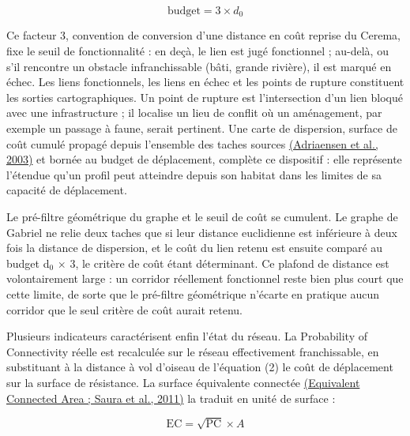 \documentclass[a4paper,11pt]{report}
\begin{document}
\begin{equation*}
\mathrm{budget} = 3 \times d_0
\tag{3}
\end{equation*}

Ce facteur 3, convention de conversion d'une distance en coût reprise du Cerema, fixe le seuil de fonctionnalité : en deçà, le lien est jugé fonctionnel ; au-delà, ou s'il rencontre un obstacle infranchissable (bâti, grande rivière), il est marqué en échec. Les liens fonctionnels, les liens en échec et les points de rupture constituent les sorties cartographiques. Un point de rupture est l'intersection d'un lien bloqué avec une infrastructure ; il localise un lieu de conflit où un aménagement, par exemple un passage à faune, serait pertinent. Une carte de dispersion, surface de coût cumulé propagé depuis l'ensemble des taches sources \hyperref[sec:bibliographie]{(Adriaensen et al., 2003)} et bornée au budget de déplacement, complète ce dispositif : elle représente l'étendue qu'un profil peut atteindre depuis son habitat dans les limites de sa capacité de déplacement.

Le pré-filtre géométrique du graphe et le seuil de coût se cumulent. Le graphe de Gabriel ne relie deux taches que si leur distance euclidienne est inférieure à deux fois la distance de dispersion, et le coût du lien retenu est ensuite comparé au budget d$_{0}$ $\times$ 3, le critère de coût étant déterminant. Ce plafond de distance est volontairement large : un corridor réellement fonctionnel reste bien plus court que cette limite, de sorte que le pré-filtre géométrique n'écarte en pratique aucun corridor que le seul critère de coût aurait retenu.

Plusieurs indicateurs caractérisent enfin l'état du réseau. La Probability of Connectivity réelle est recalculée sur le réseau effectivement franchissable, en substituant à la distance à vol d'oiseau de l'équation (2) le coût de déplacement sur la surface de résistance. La surface équivalente connectée \hyperref[sec:bibliographie]{(Equivalent Connected Area ; Saura et al., 2011)} la traduit en unité de surface :

\begin{equation*}
\mathrm{EC} = \sqrt{\mathrm{PC}} \times A
\tag{4}
\end{equation*}
\end{document}
